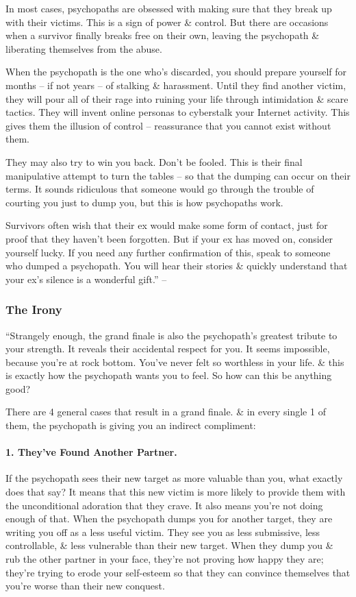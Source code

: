 \documentclass{article}
\numberwithin{equation}{section}
\begin{document}
In most cases, psychopaths are obsessed with making sure that they break up with their victims. This is a sign of power \& control. But there are occasions when a survivor finally breaks free on their own, leaving the psychopath \& liberating themselves from the abuse.

When the psychopath is the one who's discarded, you should prepare yourself for months -- if not years -- of stalking \& harassment. Until they find another victim, they will pour all of their rage into ruining your life through intimidation \& scare tactics. They will invent online personas to cyberstalk your Internet activity. This gives them the illusion of control -- reassurance that you cannot exist without them.

They may also try to win you back. Don't be fooled. This is their final manipulative attempt to turn the tables -- so that the dumping can occur on their terms. It sounds ridiculous that someone would go through the trouble of courting you just to dump you, but this is how psychopaths work.

Survivors often wish that their ex would make some form of contact, just for proof that they haven't been forgotten. But if your ex has moved on, consider yourself lucky. If you need any further confirmation of this, speak to someone who dumped a psychopath. You will hear their stories \& quickly understand that your ex's silence is a wonderful gift.'' -- \cite[pp. 82--83]{MacKenzie2015}

\subsubsection{The Irony}
``Strangely enough, the grand finale is also the psychopath's greatest tribute to your strength. It reveals their accidental respect for you. It seems impossible, because you're at rock bottom. You've never felt so worthless in your life. \& this is exactly how the psychopath wants you to feel. So how can this be anything good?

There are 4 general cases that result in a grand finale. \& in every single 1 of them, the psychopath is giving you an indirect compliment:

\paragraph{1. They've Found Another Partner.} If the psychopath sees their new target as more valuable than you, what exactly does that say? It means that this new victim is more likely to provide them with the unconditional adoration that they crave. It also means you're not doing enough of that. When the psychopath dumps you for another target, they are writing you off as a less useful victim. They see you as less submissive, less controllable, \& less vulnerable than their new target. When they dump you \& rub the other partner in your face, they're not proving how happy they are; they're trying to erode your self-esteem so that they can convince themselves that you're worse than their new conquest.
\end{document}

